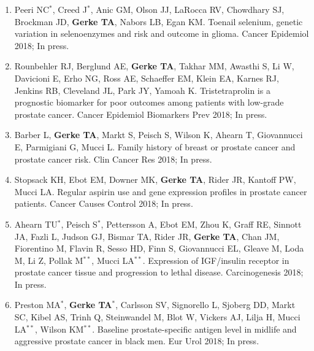\documentclass[11pt, a4paper]{article} %
\begin{document}
\begin{enumerate}[leftmargin=*]
\item{} Peeri NC$^*$, Creed J$^*$, Anic GM, Olson JJ, LaRocca RV, Chowdhary SJ, Brockman JD, {\bf Gerke TA}, Nabors LB, Egan KM. Toenail selenium, genetic variation in selenoenzymes and risk and outcome in glioma. Cancer Epidemiol 2018; In press.

\item{} Rounbehler RJ, Berglund AE, {\bf Gerke TA}, Takhar MM, Awasthi S, Li W, Davicioni E, Erho NG, Ross AE, Schaeffer EM, Klein EA, Karnes RJ, Jenkins RB, Cleveland JL, Park JY, Yamoah K. Tristetraprolin is a prognostic biomarker for poor outcomes among patients with low-grade prostate cancer. Cancer Epidemiol Biomarkers Prev 2018; In press.

\item{} Barber L, {\bf Gerke TA}, Markt S, Peisch S, Wilson K, Ahearn T, Giovannucci E, Parmigiani G, Mucci L. Family history of breast or prostate cancer and prostate cancer risk. Clin Cancer Res 2018; In press.

\item{} Stopsack KH, Ebot EM, Downer MK, {\bf Gerke TA}, Rider JR, Kantoff PW, Mucci LA. Regular aspirin use and gene expression profiles in prostate cancer patients. 	Cancer Causes Control 2018; In press.

\item{} Ahearn TU$^*$, Peisch S$^*$, Pettersson A, Ebot EM, Zhou K, Graff RE, Sinnott JA, Fazli L, Judson GJ, Bismar TA, Rider JR, {\bf Gerke TA}, Chan JM, Fiorentino M, Flavin R, Sesso HD, Finn S, Giovannucci EL, Gleave M, Loda M, Li Z, Pollak M$^{**}$, Mucci LA$^{**}$. Expression of IGF/insulin receptor in prostate cancer tissue and progression to lethal disease. Carcinogenesis 2018; In press. 

\item{} Preston MA$^*$, {\bf Gerke TA$^*$}, Carlsson SV, Signorello L, Sjoberg DD, Markt SC, Kibel AS, Trinh Q, Steinwandel M, Blot W, Vickers AJ, Lilja H, Mucci LA$^{**}$, Wilson KM$^{**}$. Baseline prostate-specific antigen level in midlife and aggressive prostate cancer in black men. Eur Urol 2018; In press.

\end{enumerate}
\end{document}
